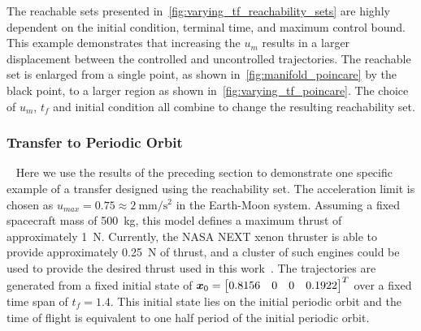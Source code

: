 \documentclass[smallcondensed]{svjour3}
\begin{document}
The reachable sets presented in~\cref{fig:varying_tf_reachability_sets} are highly dependent on the initial condition, terminal time, and maximum control bound. 
This example demonstrates that increasing the \( u_m \) results in a larger displacement between the controlled and uncontrolled trajectories.
The reachable set is enlarged from a single point, as shown in~\cref{fig:manifold_poincare} by the black point, to a larger region as shown in~\cref{fig:varying_tf_poincare}.
The choice of \( u_m\), \( t_f \) and initial condition all combine to change the resulting reachability set. 

\subsubsection{Transfer to Periodic Orbit}~\label{sssec:periodic_orbit_transfer}
Here we use the results of the preceding section to demonstrate one specific example of a transfer designed using the reachability set.
The acceleration limit is chosen as  \( u_{max} = 0.75 \approx \SI{2}{\milli\meter\per\second\squared} \) in the Earth-Moon system.
Assuming a fixed spacecraft mass of \SI{500}{\kilo\gram}, this model defines a maximum thrust of approximately \SI{1}{\newton}.
Currently, the NASA NEXT xenon thruster is able to provide approximately \SI{0.25}{\newton} of thrust, and a cluster of such engines could be used to provide the desired thrust used in this work~\cite{schmidt2008}.
The trajectories are generated from a fixed initial state of \( \bm{x}_0 = \begin{bmatrix}0.8156 & 0 & 0 & 0.1922 \end{bmatrix}^T \) over a fixed time span of \( t_f = 1.4 \).
This initial state lies on the initial periodic orbit and the time of flight is equivalent to one half period of the initial periodic orbit. 
\end{document}
